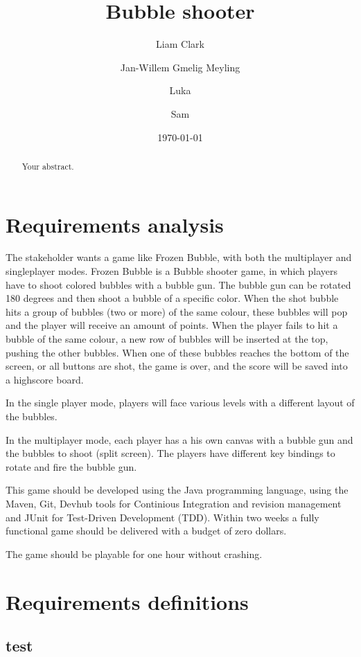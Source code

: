 \documentclass[a4paper]{article}
\title{Bubble shooter}
\author{Liam Clark}
\author{Jan-Willem Gmelig Meyling}
\author{Luka}
\author{Sam}
\date{\today}
\begin{document}
\maketitle

\begin{abstract}
Your abstract.
\end{abstract}


\section{Requirements analysis}
The stakeholder wants a game like Frozen Bubble, with both the multiplayer and singleplayer modes. Frozen Bubble is a Bubble shooter game, in which players have to shoot colored bubbles with a bubble gun. The bubble gun can be rotated 180 degrees and then shoot a bubble of a specific color. When the shot bubble hits a group of bubbles (two or more) of the same colour, these bubbles will pop and the player will receive an amount of points. When the player fails to hit a bubble of the same colour, a new row of bubbles will be inserted at the top, pushing the other bubbles. When one of these bubbles reaches the bottom of the screen, or all buttons are shot, the game is over, and the score will be saved into a highscore board.
\par In the single player mode, players will face various levels with a different layout of the bubbles.
\par In the multiplayer mode, each player has a his own canvas with a bubble gun and the bubbles to shoot (split screen). The players have different key bindings to rotate and fire the bubble gun.
\par This game should be developed using the Java programming language, using the Maven, Git, Devhub tools for Continious Integration and revision management and JUnit for Test-Driven Development (TDD). Within two weeks a fully functional game should be delivered with a budget of zero dollars.
\par The game should be playable for one hour without crashing.

\section{Requirements definitions}
\subsection{test}
\end{document}
